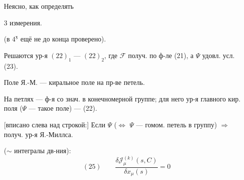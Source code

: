 Неясно, как определять

 3 измерения.

(в \(4^{\underline{\text{х}}}\) ещё не до конца проверено).

Решаются ур-я \((22)_1\) --- \((22)_2\), где \(\mathcal{F}\) получ. по ф-ле (21), а \(\Psi\) удовл. усл. (23).

Поле Я.-М. --- киральное поле на пр-ве петель.

На петлях --- ф-я со знач. в конечномерной группе; для него ур-я главного кир. поля (\(\Psi\) --- такое поле) --- (22).

[вписано слева над строкой:] Если \(\Psi\) 
(\(\Leftrightarrow\) \(\Psi\) --- гомом. петель в группу) \(\Rightarrow\) получ. ур-я Я.-Миллса.

 (\(\sim\) интегралы дв-ния):
\[
(25)\qquad
\frac{\delta\mathcal{J}^{(k)}_\mu(s,C)}{\delta x_\mu(s)}=0
\]


